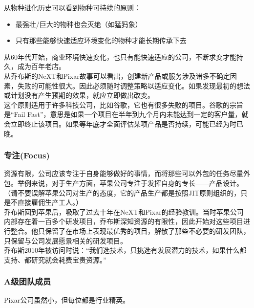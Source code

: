 从物种进化历史可以看到物种可持续的原则：

\begin{itemize}
\tightlist
\item
  最强壮/巨大的物种也会灭绝（如猛犸象）
\item
  只有那些能够快速适应环境变化的物种才能长期传承下去
\end{itemize}

从60年代开始，商业环境快速变化，也只有能快速适应的公司，不断求变才能持久，成为百年老店。\\
从乔布斯的NeXT和Pixar故事可以看出，创建新产品或服务涉及诸多不确定因素，失败的可能性很大。因此必须随时调整策略以适应变化。如果发现最初的想法或计划没有产生预期的效果，就应立即做出改变。\\
这个原则适用于许多科技公司，比如谷歌，它也有很多失败的项目。谷歌的宗旨是``Fail
Fast''，意思是如果一个项目在半年到九个月内未能达到一定的客户量，就会立即终止该项目。如果等年底才全面评估某项产品是否持续，可能已经为时已晚。\\

\hypertarget{ux4e13ux6ce8focus}{%
\subsubsection{专注(Focus)}\label{ux4e13ux6ce8focus}}

资源有限，公司应该专注于自身能够做好的事情，而将那些可以外包的任务尽量外包。举例来说，对于生产方面，苹果公司专注于发挥自身的专长------产品设计。（请不要误解苹果公司对生产的态度，它的产品生产都是按照JIT原则组织的，只是不直接雇佣生产工人。）\\
乔布斯回到苹果后，吸取了过去十年在NeXT和Pixar的经验教训。当时苹果公司内部存在着一百多个研发项目，乔布斯深知资源的有限性，因此开始对这些项目进行整合。他只保留了在市场上表现最优秀的项目，解散了那些不必要的研发团队，只保留与公司发展愿景相关的研发项目。\\
乔布斯2010年被访问时说：``我们选技术，只挑选有发展潜力的技术，如果什么都支持、都研究就会耗费宝贵资源。''

\hypertarget{aux7ea7ux56e2ux961fux6210ux5458}{%
\subsubsection{A级团队成员}\label{aux7ea7ux56e2ux961fux6210ux5458}}

Pixar公司虽然小，但每位都是行业精英。

